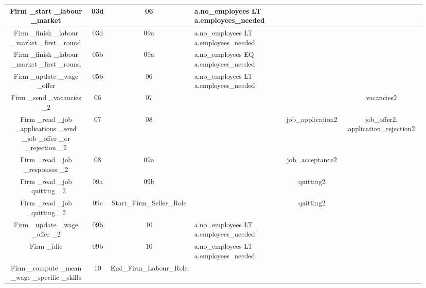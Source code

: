 \begin{landscape}
\begin{table}[!htb]
\begin{center}
\begin{tabular}{|c|c|c|l|c|c|}
{\parbox[l]{5cm}{Firm \_start \_labour \_market}}&
{\parbox[l]{3cm}{03d}}&
{\parbox[l]{3cm}{06}}&{\parbox[l]{4cm}{a.no\_employees LT
a.employees\_needed}}
 & &
\\
\hline {\parbox[l]{5cm}{Firm \_finish \_labour \_market \_first
\_round}}& {\parbox[l]{3cm}{03d}}&
{\parbox[l]{3cm}{09a}}&{\parbox[l]{4cm}{a.no\_employees LT
a.employees\_needed}} & &
\\
\hline {\parbox[l]{5cm}{Firm \_finish \_labour \_market \_first
\_round}}& {\parbox[l]{3cm}{05b}}&
{\parbox[l]{3cm}{09a}}&{\parbox[l]{4cm}{a.no\_employees EQ
a.employees\_needed}}
 & &
\\

\hline {\parbox[l]{5cm}{Firm \_update \_wage \_offer}}&
{\parbox[l]{3cm}{05b}}&
{\parbox[l]{3cm}{06}}&{\parbox[l]{4cm}{a.no\_employees LT
a.employees\_needed}}
 & &
\\

\hline {\parbox[l]{5cm}{Firm \_send \_vacancies \_2}}&
{\parbox[l]{3cm}{06}}& {\parbox[l]{3cm}{07}}&
 & & {\parbox[l]{3cm}{vacancies2}}
 \\

\hline {\parbox[l]{5cm}{Firm \_read \_job \_applications \_send
\_job \_offer \_or \_rejection \_2}}& {\parbox[l]{3cm}{07}}&
{\parbox[l]{3cm}{08}}& &{\parbox[l]{3cm}{job\_application2}} &
{\parbox[l]{3cm}{job\_offer2, application\_rejection2}}
\\

\hline {\parbox[l]{5cm}{Firm \_read \_job \_responses \_2}}&
{\parbox[l]{3cm}{08}}& {\parbox[l]{3cm}{09a}}& &
{\parbox[l]{3cm}{job\_acceptance2}} &
\\

\hline {\parbox[l]{5cm}{Firm \_read \_job \_quitting \_2}}&
{\parbox[l]{3cm}{09a}}&
{\parbox[l]{3cm}{09b}}&&{\parbox[l]{3cm}{quitting2}}
 &
\\
\hline {\parbox[l]{5cm}{Firm \_read \_job \_quitting \_2}}&
{\parbox[l]{3cm}{09c}}& {\parbox[l]{4cm}{Start\_Firm\_Seller\_Role}}&& {\parbox[l]{3cm}{quitting2}}
 &
\\

\hline {\parbox[l]{5cm}{Firm \_update \_wage \_offer \_2}}&
{\parbox[l]{3cm}{09b}}&
{\parbox[l]{3cm}{10}}&{\parbox[l]{4cm}{a.no\_employees LT
a.employees\_needed}}
 & &
\\

\hline {\parbox[l]{5cm}{Firm \_idle}}& {\parbox[l]{3cm}{09b}}&
{\parbox[l]{3cm}{10}}&{\parbox[l]{4cm}{a.no\_employees LT
a.employees\_needed}}
 & &
\\

\hline {\parbox[l]{5cm}{Firm \_compute \_mean \_wage \_specific
\_skills}}& {\parbox[l]{3cm}{10}}& {\parbox[l]{4cm}{End\_Firm\_Labour\_Role}}&
 & &
\\
\hline


\end{tabular}\end{center}\label{tab:labourfirm}
\end{table}
\end{landscape}

